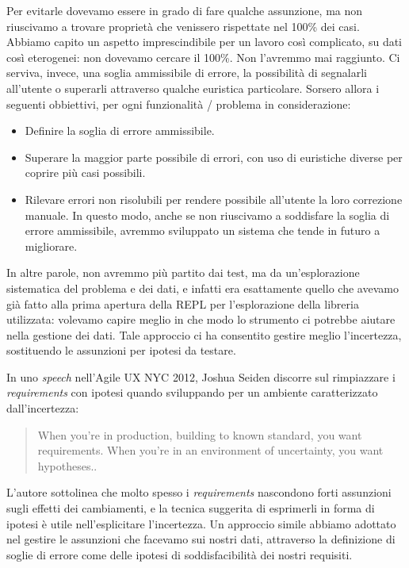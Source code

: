 \documentclass[12pt]{report}
\begin{document}
Per evitarle dovevamo essere in grado di fare qualche assunzione, ma non riuscivamo a trovare proprietà che venissero rispettate nel 100\% dei casi. Abbiamo capito un aspetto imprescindibile per un lavoro così complicato, su dati così eterogenei: non dovevamo cercare il 100\%. Non l'avremmo mai raggiunto. Ci serviva, invece, una soglia ammissibile di errore, la possibilità di segnalarli all'utente o superarli attraverso qualche euristica particolare. Sorsero allora i seguenti obbiettivi, per ogni funzionalità / problema in considerazione: 

\begin{itemize}
  \item Definire la soglia di errore ammissibile.
  \item Superare la maggior parte possibile di errori, con uso di euristiche diverse per coprire più casi possibili.
  \item Rilevare errori non risolubili per rendere possibile all'utente la loro correzione manuale. In questo modo, anche se non riuscivamo a soddisfare la soglia di errore ammissibile, avremmo sviluppato un sistema che tende in futuro a migliorare.
\end{itemize}

In altre parole, non avremmo più partito dai test, ma da un'esplorazione sistematica del problema e dei dati, e infatti era esattamente quello che avevamo già fatto alla prima apertura della REPL per l'esplorazione della libreria utilizzata: volevamo capire meglio in che modo lo strumento ci potrebbe aiutare nella gestione dei dati. Tale approccio ci ha consentito gestire meglio l'incertezza, sostituendo le assunzioni per ipotesi da testare.

In uno \textit{speech} nell'Agile UX NYC 2012, Joshua Seiden discorre sul rimpiazzare i \textit{requirements} con ipotesi quando sviluppando per un ambiente caratterizzato dall'incertezza: 

\begin{quote}
When you're in production, building to known standard, you want requirements. 
When you're in an environment of uncertainty, you want hypotheses.\cite{seiden2012}.
\end{quote}

L'autore sottolinea che molto spesso i \textit{requirements} nascondono forti assunzioni sugli effetti dei cambiamenti, e la tecnica suggerita di esprimerli in forma di ipotesi è utile nell'esplicitare l'incertezza. Un approccio simile abbiamo adottato nel gestire le assunzioni che facevamo sui nostri dati, attraverso la definizione di soglie di errore come delle ipotesi di soddisfacibilità dei nostri requisiti.
\end{document}
